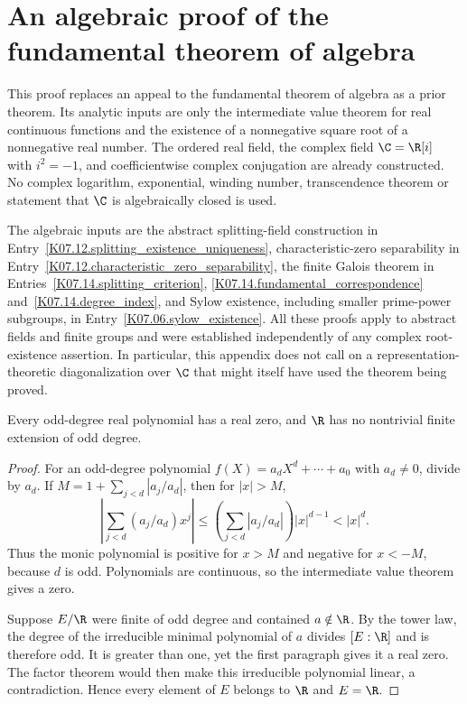 \chapter{An algebraic proof of the fundamental theorem of algebra}
\label{app:algebraic-fta}

This proof replaces an appeal to the fundamental theorem of algebra as a prior theorem. Its analytic inputs are only the intermediate value theorem for real continuous functions and the existence of a nonnegative square root of a nonnegative real number. The ordered real field, the complex field $\C=\R[i]$ with $i^2=-1$, and coefficientwise complex conjugation are already constructed. No complex logarithm, exponential, winding number, transcendence theorem or statement that $\C$ is algebraically closed is used.

The algebraic inputs are the abstract splitting-field construction in Entry~\ref{K07.12.splitting_existence_uniqueness}, characteristic-zero separability in Entry~\ref{K07.12.characteristic_zero_separability}, the finite Galois theorem in Entries~\ref{K07.14.splitting_criterion}, \ref{K07.14.fundamental_correspondence} and~\ref{K07.14.degree_index}, and Sylow existence, including smaller prime-power subgroups, in Entry~\ref{K07.06.sylow_existence}. All these proofs apply to abstract fields and finite groups and were established independently of any complex root-existence assertion. In particular, this appendix does not call on a representation-theoretic diagonalization over $\C$ that might itself have used the theorem being proved.

\begin{lemma}\label{lem:real-no-odd-extension}
Every odd-degree real polynomial has a real zero, and $\R$ has no nontrivial finite extension of odd degree.
\end{lemma}
\begin{proof}
For an odd-degree polynomial $f(X)=a_dX^d+\cdots+a_0$ with $a_d\ne0$, divide by $a_d$. If $M=1+\sum_{j<d}|a_j/a_d|$, then for $|x|>M$,
\[\left|\sum_{j<d}(a_j/a_d)x^j\right|
 \leq\left(\sum_{j<d}|a_j/a_d|\right)|x|^{d-1}<|x|^d.
\]
Thus the monic polynomial is positive for $x>M$ and negative for $x<-M$, because $d$ is odd. Polynomials are continuous, so the intermediate value theorem gives a zero.

Suppose $E/\R$ were finite of odd degree and contained $a\notin\R$. By the tower law, the degree of the irreducible minimal polynomial of $a$ divides $[E:\R]$ and is therefore odd. It is greater than one, yet the first paragraph gives it a real zero. The factor theorem would then make this irreducible polynomial linear, a contradiction. Hence every element of $E$ belongs to $\R$ and $E=\R$.
\end{proof}

